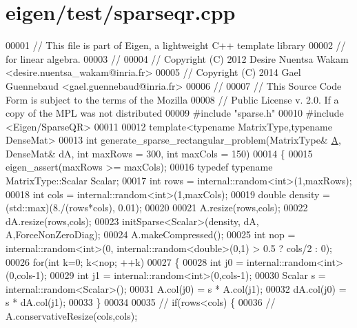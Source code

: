 \hypertarget{eigen_2test_2sparseqr_8cpp_source}{}\section{eigen/test/sparseqr.cpp}
\label{eigen_2test_2sparseqr_8cpp_source}

\begin{DoxyCode}
00001 \textcolor{comment}{// This file is part of Eigen, a lightweight C++ template library}
00002 \textcolor{comment}{// for linear algebra.}
00003 \textcolor{comment}{//}
00004 \textcolor{comment}{// Copyright (C) 2012 Desire Nuentsa Wakam <desire.nuentsa\_wakam@inria.fr>}
00005 \textcolor{comment}{// Copyright (C) 2014 Gael Guennebaud <gael.guennebaud@inria.fr>}
00006 \textcolor{comment}{//}
00007 \textcolor{comment}{// This Source Code Form is subject to the terms of the Mozilla}
00008 \textcolor{comment}{// Public License v. 2.0. If a copy of the MPL was not distributed}
00009 \textcolor{preprocessor}{#include "sparse.h"}
00010 \textcolor{preprocessor}{#include <Eigen/SparseQR>}
00011 
00012 \textcolor{keyword}{template}<\textcolor{keyword}{typename} MatrixType,\textcolor{keyword}{typename} DenseMat>
00013 \textcolor{keywordtype}{int} generate\_sparse\_rectangular\_problem(MatrixType& \hyperlink{group___core___module_class_eigen_1_1_matrix}{A}, DenseMat& dA, \textcolor{keywordtype}{int} maxRows = 300, \textcolor{keywordtype}{int} maxCols = 150)
00014 \{
00015   eigen\_assert(maxRows >= maxCols);
00016   \textcolor{keyword}{typedef} \textcolor{keyword}{typename} MatrixType::Scalar Scalar;
00017   \textcolor{keywordtype}{int} rows = internal::random<int>(1,maxRows);
00018   \textcolor{keywordtype}{int} cols = internal::random<int>(1,maxCols);
00019   \textcolor{keywordtype}{double} density = (std::max)(8./(rows*cols), 0.01);
00020   
00021   A.resize(rows,cols);
00022   dA.resize(rows,cols);
00023   initSparse<Scalar>(density, dA, A,ForceNonZeroDiag);
00024   A.makeCompressed();
00025   \textcolor{keywordtype}{int} nop = internal::random<int>(0, internal::random<double>(0,1) > 0.5 ? cols/2 : 0);
00026   \textcolor{keywordflow}{for}(\textcolor{keywordtype}{int} k=0; k<nop; ++k)
00027   \{
00028     \textcolor{keywordtype}{int} j0 = internal::random<int>(0,cols-1);
00029     \textcolor{keywordtype}{int} j1 = internal::random<int>(0,cols-1);
00030     Scalar s = internal::random<Scalar>();
00031     A.col(j0)  = s * A.col(j1);
00032     dA.col(j0) = s * dA.col(j1);
00033   \}
00034   
00035 \textcolor{comment}{//   if(rows<cols) \{}
00036 \textcolor{comment}{//     A.conservativeResize(cols,cols);}

\end{DoxyCode}
